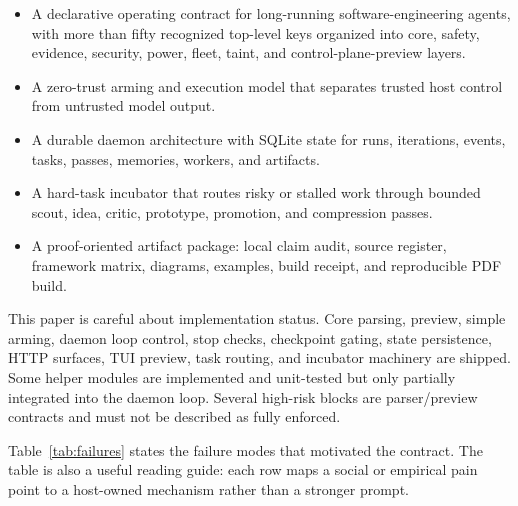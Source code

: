 \documentclass[conference]{IEEEtran}
\begin{document}
\begin{itemize}
  \item A declarative operating contract for long-running software-engineering agents, with more than fifty recognized top-level keys organized into core, safety, evidence, security, power, fleet, taint, and control-plane-preview layers.
  \item A zero-trust arming and execution model that separates trusted host control from untrusted model output.
  \item A durable daemon architecture with SQLite state for runs, iterations, events, tasks, passes, memories, workers, and artifacts.
  \item A hard-task incubator that routes risky or stalled work through bounded scout, idea, critic, prototype, promotion, and compression passes.
  \item A proof-oriented artifact package: local claim audit, source register, framework matrix, diagrams, examples, build receipt, and reproducible PDF build.
\end{itemize}

This paper is careful about implementation status. Core parsing, preview, simple arming, daemon loop control, stop checks, checkpoint gating, state persistence, HTTP surfaces, TUI preview, task routing, and incubator machinery are shipped. Some helper modules are implemented and unit-tested but only partially integrated into the daemon loop. Several high-risk blocks are parser/preview contracts and must not be described as fully enforced.

Table~\ref{tab:failures} states the failure modes that motivated the contract. The table is also a useful reading guide: each row maps a social or empirical pain point to a host-owned mechanism rather than a stronger prompt.
\end{document}

